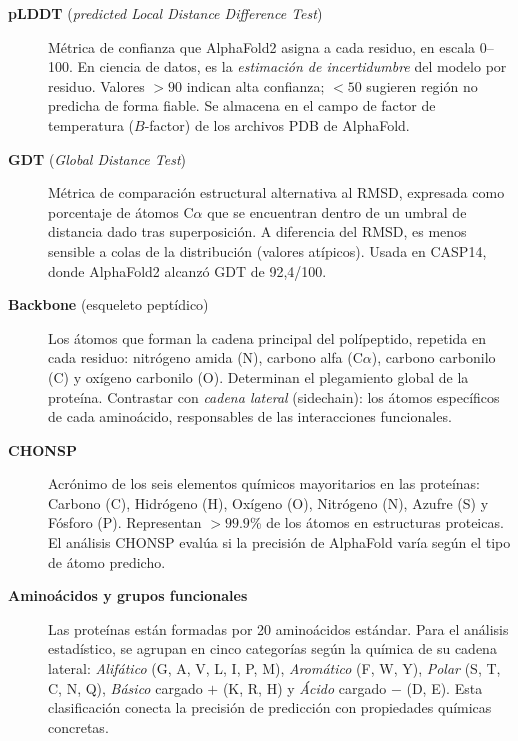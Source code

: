\begin{description}
    \item[\textbf{pLDDT} (\textit{predicted Local Distance Difference Test})]
    M\'etrica de confianza que AlphaFold2 asigna a cada residuo, en escala 0--100.
    En ciencia de datos, es la \emph{estimaci\'on de incertidumbre} del modelo por residuo.
    Valores $>90$ indican alta confianza; $<50$ sugieren regi\'on no predicha de forma
    fiable. Se almacena en el campo de factor de temperatura ($B$-factor) de los
    archivos PDB de AlphaFold.

    \item[\textbf{GDT} (\textit{Global Distance Test})]
    M\'etrica de comparaci\'on estructural alternativa al RMSD, expresada como porcentaje
    de \'atomos C$\alpha$ que se encuentran dentro de un umbral de distancia dado tras
    superposici\'on. A diferencia del RMSD, es menos sensible a colas de la distribuci\'on
    (valores at\'ipicos). Usada en CASP14, donde AlphaFold2 alcanz\'o GDT de 92,4/100.

    \item[\textbf{Backbone} (esqueleto pept\'idico)]
    Los \'atomos que forman la cadena principal del pol\'ipeptido, repetida en cada
    residuo: nitr\'ogeno amida (N), carbono alfa (C$\alpha$), carbono carbonilo (C)
    y ox\'igeno carbonilo (O). Determinan el plegamiento global de la prote\'ina.
    Contrastar con \emph{cadena lateral} (sidechain): los \'atomos espec\'ificos de cada
    amino\'acido, responsables de las interacciones funcionales.

    \item[\textbf{CHONSP}]
    Acr\'onimo de los seis elementos qu\'imicos mayoritarios en las prote\'inas:
    Carbono (C), Hidr\'ogeno (H), Ox\'igeno (O), Nitr\'ogeno (N), Azufre (S) y
    F\'osforo (P). Representan $>99.9$\% de los \'atomos en estructuras proteicas.
    El an\'alisis CHONSP eval\'ua si la precisi\'on de AlphaFold var\'ia seg\'un el
    tipo de \'atomo predicho.

    \item[\textbf{Amino\'acidos y grupos funcionales}]
    Las prote\'inas est\'an formadas por 20 amino\'acidos est\'andar. Para el an\'alisis
    estad\'istico, se agrupan en cinco categor\'ias seg\'un la qu\'imica de su cadena lateral:
    \emph{Alif\'atico} (G, A, V, L, I, P, M), \emph{Arom\'atico} (F, W, Y),
    \emph{Polar} (S, T, C, N, Q), \emph{B\'asico} cargado $+$ (K, R, H) y
    \emph{\'Acido} cargado $-$ (D, E). Esta clasificaci\'on conecta la precisi\'on de
    predicci\'on con propiedades qu\'imicas concretas.


\end{description}
